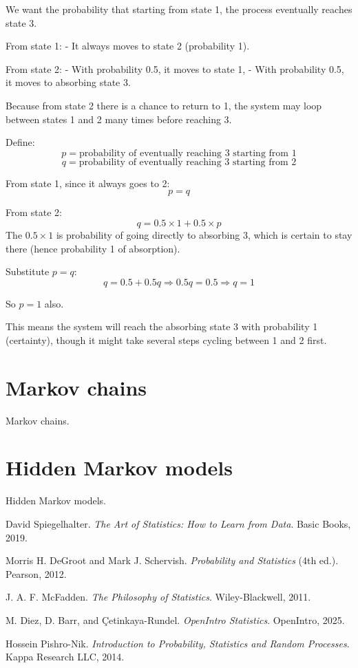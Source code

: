 \documentclass{book}
\begin{document}
We want the probability that starting from state 1, the process eventually reaches state 3.

From state 1:
- It always moves to state 2 (probability 1).

From state 2:
- With probability 0.5, it moves to state 1,
- With probability 0.5, it moves to absorbing state 3.

Because from state 2 there is a chance to return to 1, the system may loop between states 1 and 2 many times before reaching 3.

Define:
\[
p = \text{probability of eventually reaching 3 starting from 1}
\]
\[
q = \text{probability of eventually reaching 3 starting from 2}
\]

From state 1, since it always goes to 2:
\[
p = q
\]

From state 2:
\[
q = 0.5 \times 1 + 0.5 \times p
\]
The $0.5 \times 1$ is probability of going directly to absorbing 3, which is certain to stay there (hence probability 1 of absorption).

Substitute $p = q$:
\[
q = 0.5 + 0.5 q
\Rightarrow 0.5 q = 0.5
\Rightarrow q = 1
\]

So $p = 1$ also.

This means the system will reach the absorbing state 3 with probability 1 (certainty), though it might take several steps cycling between 1 and 2 first.

\newpage

\section{Markov chains}
Markov chains.

\newpage

\section{Hidden Markov models}
Hidden Markov models.


\backmatter
 
\begin{thebibliography}{999}

David Spiegelhalter. 
\textit{The Art of Statistics: How to Learn from Data}. 
Basic Books, 2019.

Morris H. DeGroot and Mark J. Schervish.
\textit{Probability and Statistics} (4th ed.).
Pearson, 2012.

J. A. F. McFadden.
\textit{The Philosophy of Statistics}.
Wiley-Blackwell, 2011.

M. Diez, D. Barr, and Çetinkaya-Rundel.
\textit{OpenIntro Statistics}.
OpenIntro, 2025.

Hossein Pishro-Nik.
\textit{Introduction to Probability, Statistics and Random Processes}.
Kappa Research LLC, 2014.

\end{thebibliography}
\end{document}
